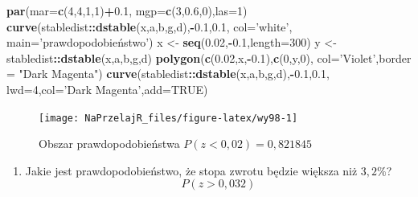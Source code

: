 \documentclass[polish,]{book}
\newenvironment{Shaded}{\begin{snugshade}}{\end{snugshade}}
\newcommand{\DataTypeTok}[1]{\textcolor[rgb]{0.13,0.29,0.53}{#1}}
\newcommand{\DecValTok}[1]{\textcolor[rgb]{0.00,0.00,0.81}{#1}}
\newcommand{\FloatTok}[1]{\textcolor[rgb]{0.00,0.00,0.81}{#1}}
\newcommand{\KeywordTok}[1]{\textcolor[rgb]{0.13,0.29,0.53}{\textbf{#1}}}
\newcommand{\NormalTok}[1]{#1}
\newcommand{\OperatorTok}[1]{\textcolor[rgb]{0.81,0.36,0.00}{\textbf{#1}}}
\newcommand{\OtherTok}[1]{\textcolor[rgb]{0.56,0.35,0.01}{#1}}
\newcommand{\StringTok}[1]{\textcolor[rgb]{0.31,0.60,0.02}{#1}}
\providecommand{\tightlist}{%
  \setlength{\itemsep}{0pt}\setlength{\parskip}{0pt}}
\begin{document}
\begin{Shaded}
\begin{Highlighting}[]
\KeywordTok{par}\NormalTok{(}\DataTypeTok{mar=}\KeywordTok{c}\NormalTok{(}\DecValTok{4}\NormalTok{,}\DecValTok{4}\NormalTok{,}\DecValTok{1}\NormalTok{,}\DecValTok{1}\NormalTok{)}\OperatorTok{+}\FloatTok{0.1}\NormalTok{, }\DataTypeTok{mgp=}\KeywordTok{c}\NormalTok{(}\DecValTok{3}\NormalTok{,}\FloatTok{0.6}\NormalTok{,}\DecValTok{0}\NormalTok{),}\DataTypeTok{las=}\DecValTok{1}\NormalTok{)}
\KeywordTok{curve}\NormalTok{(stabledist}\OperatorTok{::}\KeywordTok{dstable}\NormalTok{(x,a,b,g,d),}\OperatorTok{-}\FloatTok{0.1}\NormalTok{,}\FloatTok{0.1}\NormalTok{,}
      \DataTypeTok{col=}\StringTok{'white'}\NormalTok{, }\DataTypeTok{main=}\StringTok{'prawdopodobieństwo'}\NormalTok{)}
\NormalTok{x <-}\StringTok{ }\KeywordTok{seq}\NormalTok{(}\FloatTok{0.02}\NormalTok{,}\OperatorTok{-}\FloatTok{0.1}\NormalTok{,}\DataTypeTok{length=}\DecValTok{300}\NormalTok{)}
\NormalTok{y <-}\StringTok{ }\NormalTok{stabledist}\OperatorTok{::}\KeywordTok{dstable}\NormalTok{(x,a,b,g,d)}
\KeywordTok{polygon}\NormalTok{(}\KeywordTok{c}\NormalTok{(}\FloatTok{0.02}\NormalTok{,x,}\OperatorTok{-}\FloatTok{0.1}\NormalTok{),}\KeywordTok{c}\NormalTok{(}\DecValTok{0}\NormalTok{,y,}\DecValTok{0}\NormalTok{),}
        \DataTypeTok{col=}\StringTok{'Violet'}\NormalTok{,}\DataTypeTok{border =} \StringTok{"Dark Magenta"}\NormalTok{)}
\KeywordTok{curve}\NormalTok{(stabledist}\OperatorTok{::}\KeywordTok{dstable}\NormalTok{(x,a,b,g,d),}\OperatorTok{-}\FloatTok{0.1}\NormalTok{,}\FloatTok{0.1}\NormalTok{,}
      \DataTypeTok{lwd=}\DecValTok{4}\NormalTok{,}\DataTypeTok{col=}\StringTok{'Dark Magenta'}\NormalTok{,}\DataTypeTok{add=}\OtherTok{TRUE}\NormalTok{)}
\end{Highlighting}
\end{Shaded}

\begin{figure}[h]

{\centering \texttt{[image: NaPrzelajR\_files/figure-latex/wy98-1]} 

}

\caption{Obszar prawdopodobieństwa $P(z<0,02)=0,821845$}\label{fig:wy98}
\end{figure}

\begin{enumerate}
\def\labelenumi{\arabic{enumi}.}
\setcounter{enumi}{1}
\tightlist
\item
  Jakie jest prawdopodobieństwo, że stopa zwrotu będzie większa niż \(3,2\%\)?
  \[P(z > 0,032)\]
\end{enumerate}
\end{document}
